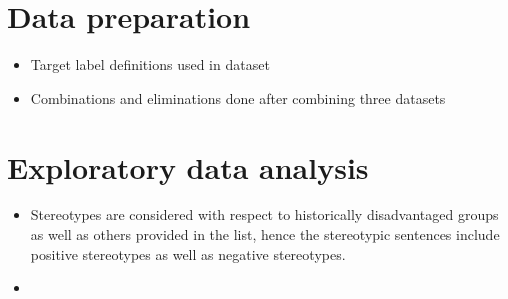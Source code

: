 \section{Data preparation}\label{data preparation}
    \begin{itemize}
        \item Target label definitions used in dataset
        \item Combinations and eliminations done after combining three datasets
    \end{itemize}
\section{Exploratory data analysis}\label{EDA}
\begin{itemize}
    \item Stereotypes are considered with respect to historically disadvantaged groups as well as others provided in the list, hence the stereotypic sentences include positive stereotypes as well as negative stereotypes.
    \item 
\end{itemize}
